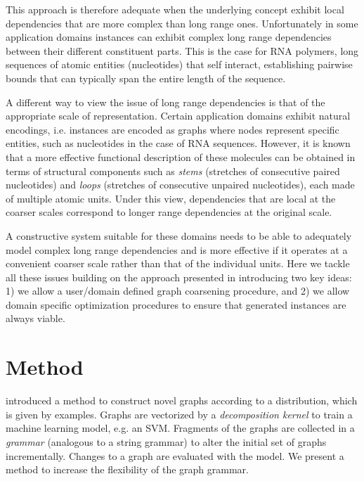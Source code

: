 \documentclass{article}
\begin{document}
This approach is therefore adequate when the underlying concept exhibit local
dependencies that are more complex than long range ones.  Unfortunately in
some application domains instances can exhibit complex long range dependencies
between their different constituent parts. This is the case for RNA polymers,
long sequences of atomic entities (nucleotides) that self interact,
establishing pairwise bounds that can typically span the entire length of the
sequence.

A different way to view the issue of long range dependencies is that of the
appropriate scale of representation. Certain application domains exhibit
natural encodings, i.e. instances are encoded as graphs where nodes
represent specific entities, such as nucleotides in the case of RNA sequences.
However, it is known that a more effective functional description of these
molecules can be obtained in terms of structural components such as {\em
stems} (stretches of consecutive paired nucleotides) and {\em loops}
(stretches of consecutive unpaired nucleotides), each made of multiple atomic
units. Under this view, dependencies that are local at the coarser scales
correspond to longer range dependencies at the original scale.

A constructive system suitable for these domains needs to be able to
adequately model complex long range dependencies and is more effective if it
operates at a convenient coarser scale rather than that of the individual
units. Here we tackle all these issues building on the approach presented in
\cite{costa16} introducing two key ideas: 1) we allow a user/domain defined graph
coarsening procedure,
and 2) we allow domain specific optimization procedures to ensure that
generated instances are always viable.


\section{Method}

\cite{costa16} introduced a method
to construct novel graphs according to a distribution, which is given by
examples. Graphs are vectorized by a \emph{decomposition kernel}
to train a machine learning model, e.g. an SVM.
Fragments of the graphs are collected in 
a \emph{grammar} (analogous to a string grammar) to alter the initial
set of graphs incrementally. Changes to a graph are evaluated with the
model. 
We present a method to increase the flexibility of the graph grammar.
\end{document}
